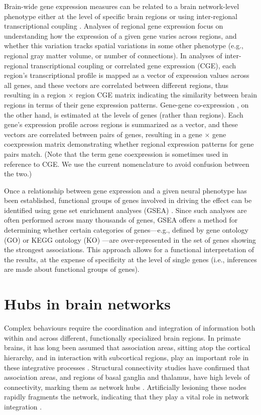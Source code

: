 Brain-wide gene expression measures can be related to a brain network-level phenotype either at the level of specific brain regions \citep{Myers2007,Rittman2016,Vertes2016b,Parkes2017} or using inter-regional transcriptional coupling \citep{Richiardi2015,Fulcher2016,Arnatkeviciute2018,Romero-Garcia2018}. Analyses of regional gene expression focus on understanding how the expression of a given gene varies across regions, and whether this variation tracks spatial variations in some other phenotype (e.g., regional gray matter volume, or number of connections). In analyses of inter-regional transcriptional coupling or correlated gene expression (CGE), each region’s transcriptional profile is mapped as a vector of expression values across all genes, and these vectors are correlated between different regions, thus resulting in a region $\times$ region CGE matrix indicating the similarity between brain regions in terms of their gene expression patterns. Gene-gene co-expression \citep{Eising2016,Keo2017,Negi2017}, on the other hand, is estimated at the levels of genes (rather than regions). Each gene’s expression profile across regions is summarized as a vector, and these vectors are correlated between pairs of genes, resulting in a gene $\times$ gene coexpression matrix demonstrating whether regional expression patterns for gene pairs match. (Note that the term gene coexpression is sometimes used in reference to CGE. We use the current nomenclature to avoid confusion between the two.)

Once a relationship between gene expression and a given neural phenotype has been established, functional groups of genes involved in driving the effect can be identified using gene set enrichment analyses (GSEA) \citep{Subramanian2005,Irizarry2009}. 
Since such analyses are often performed across many thousands of genes, GSEA offers a method for determining whether certain categories of genes---e.g., defined by gene ontology (GO) \citep{Ashburner2000} or KEGG ontology (KO) \citep{Kanehisa2000}---are over-represented in the set of genes showing the strongest associations. This approach allows for a functional interpretation of the results, at the expense of specificity at the level of single genes (i.e., inferences are made about functional groups of genes). 

\section{Hubs in brain networks}

Complex behaviours require the coordination and integration of information both within and across different, functionally specialized brain regions. In primate brains, it has long been assumed that association areas, sitting atop the cortical hierarchy, and in interaction with subcortical regions, play an important role in these integrative processes \citep{Felleman,Mesulam1998,Meyer2009a}. 
Structural connectivity  studies have confirmed that association areas, and regions of basal ganglia and thalamus, have high levels of connectivity, marking them as network hubs \citep{VandenHeuvel2011}. 
Artificially lesioning these nodes rapidly fragments the network, indicating that they play a vital role in network integration \citep{Albert2000,VandenHeuvel2011}. 

